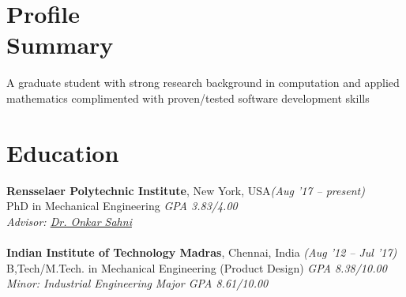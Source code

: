 \documentclass[margin,line]{res}
\begin{document}


\begin{resume}
\section{\sc Profile \\Summary}
A graduate student with strong research background in
computation and applied mathematics complimented
with proven/tested software development skills 

\section{\sc Education}
{\bf Rensselaer Polytechnic Institute}, New York, USA\hfill {\em (Aug '17 -- present)}\\
PhD in Mechanical Engineering \hfill{\em GPA 3.83/4.00}\\
{\em Advisor: \href {http://homepages.rpi.edu/~sahni/} {\color{RoyalPurple} Dr. Onkar Sahni}}\\\\
{\bf Indian Institute of Technology Madras}, Chennai, India \hfill {\em (Aug '12 -- Jul '17)}\\
B,Tech/M.Tech. in Mechanical Engineering (Product Design) \hfill{\em GPA 8.38/10.00}\\
{\em Minor: Industrial Engineering} \hfill {\em Major GPA 8.61/10.00}




\end{resume}
\end{document}
